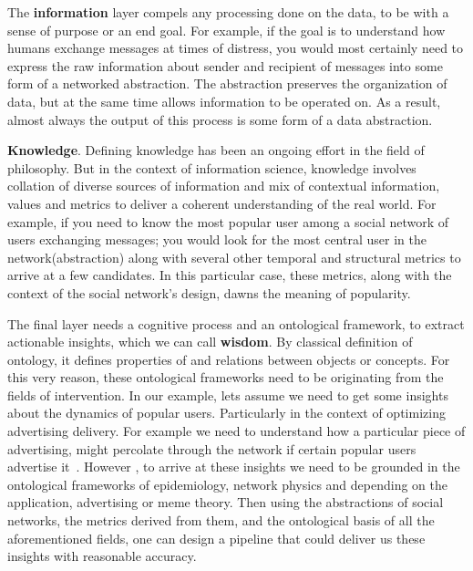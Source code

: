 The \textbf{information} layer compels any processing done on the data, to be with a sense of purpose or an end goal. For example, if the goal is to understand how humans exchange messages at times of distress, you would most certainly need to express the raw information about sender and recipient of messages into some form of a networked abstraction. The abstraction preserves the organization of data, but at the same time allows information to be operated on. As a result, almost always the output of this process is some form of a data abstraction. 

\textbf{Knowledge}. Defining knowledge has been an ongoing effort in the field of philosophy. But in the context of information science, knowledge involves collation of diverse sources of information and  mix of contextual information, values and metrics to deliver a coherent understanding of the real world. For example, if you need to know the most popular user among a social network of users exchanging messages; you would look for the most central user in the network(abstraction) along with several other temporal and structural metrics to arrive at a few candidates. In this particular case, these metrics, along with the context of the social network's design, dawns the meaning of popularity. 

The final layer needs a cognitive process and an ontological framework, to extract actionable insights, which we can call \textbf{wisdom}. By classical definition of ontology, it defines properties of and relations between objects or concepts. For this very reason, these ontological frameworks need to be originating from the fields of intervention.  In our example, lets assume we need to get some insights about the dynamics of popular users. Particularly in the context of optimizing advertising delivery. For example we need to understand how a particular piece of advertising, might percolate through the network if certain popular users advertise it~\cite{li2012diffusion}. However , to arrive at these insights we need to be grounded in the ontological frameworks of epidemiology, network physics and depending on the application, advertising or meme theory. Then using the abstractions of social networks, the metrics derived from them, and the ontological basis of all the aforementioned fields, one can design a pipeline that could deliver us these insights with reasonable accuracy. 

